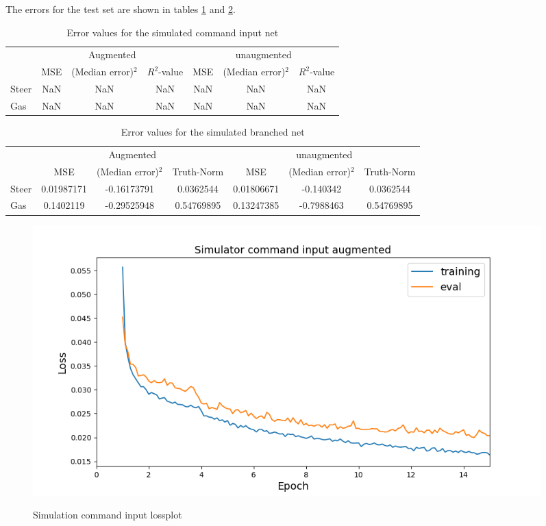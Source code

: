 \documentclass[a4paper]{article}
\begin{document}
The errors for the test set are shown in tables \ref{tab:error_command_aug} and \ref{tab:error_branched}.%
\begin{table}[H]
  \centering
  \caption{Error values for the simulated command input net}
  \begin{tabular}{lccc|ccc}
    &\multicolumn{3}{c|}{Augmented} & \multicolumn{3}{c}{unaugmented} \\
    & MSE & (Median error)$^2$ & $R^2$-value & MSE & (Median error)$^2$ & $R^2$-value\\ \hline
    Steer & NaN & NaN & NaN & NaN & NaN & NaN \\
    Gas & NaN & NaN & NaN & NaN & NaN & NaN
  \end{tabular}
  \label{tab:error_command_aug}
\end{table}
\begin{table}[H]
  \centering
  \caption{Error values for the simulated branched net}
  \begin{tabular}{lccc|ccc}
    &\multicolumn{3}{c|}{Augmented} & \multicolumn{3}{c}{unaugmented} \\
    & MSE & (Median error)$^2$ & Truth-Norm & MSE & (Median error)$^2$ & Truth-Norm\\ \hline
    Steer & 0.01987171 & -0.16173791 & 0.0362544 & 0.01806671 & -0.140342 & 0.0362544 \\
    Gas & 0.1402119 & -0.29525948 & 0.54769895 & 0.13247385 & -0.7988463 & 0.54769895
  \end{tabular}
  \label{tab:error_branched}
\end{table}
\begin{figure}[!htbp]
  \centering
  \includegraphics[width=0.95\textwidth]{figures/sim_command_input_aug_lossplot}
  \label{fig:augmented_command_loss}
  \caption{Simulation command input lossplot}
\end{figure}
\end{document}
